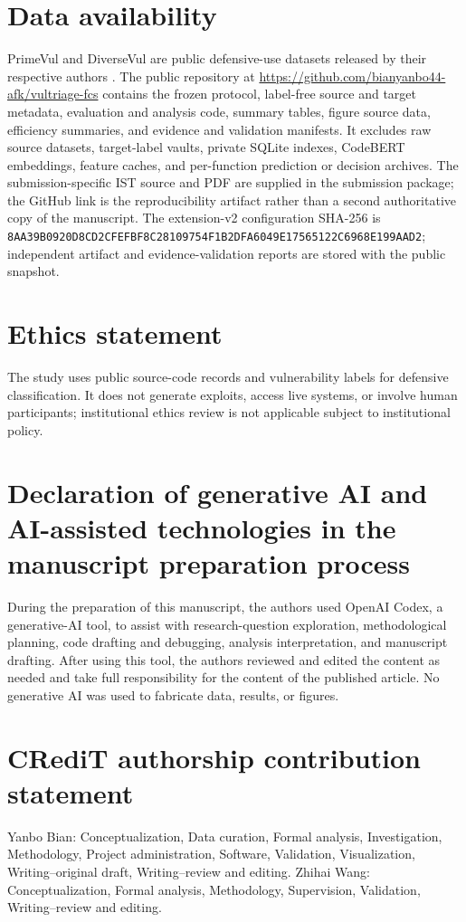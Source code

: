 \documentclass[preprint,12pt]{elsarticle}
\begin{document}
\section*{Data availability}
PrimeVul and DiverseVul are public defensive-use datasets released by their respective authors \cite{ding2025primevul,chen2023diversevul}. The public repository at \url{https://github.com/bianyanbo44-afk/vultriage-fcs} contains the frozen protocol, label-free source and target metadata, evaluation and analysis code, summary tables, figure source data, efficiency summaries, and evidence and validation manifests. It excludes raw source datasets, target-label vaults, private SQLite indexes, CodeBERT embeddings, feature caches, and per-function prediction or decision archives. The submission-specific IST source and PDF are supplied in the submission package; the GitHub link is the reproducibility artifact rather than a second authoritative copy of the manuscript. The extension-v2 configuration SHA-256 is \texttt{8AA39B09\allowbreak{}20D8CD2C\allowbreak{}FEFBF8C2\allowbreak{}8109754F\allowbreak{}1B2DFA60\allowbreak{}49E17565\allowbreak{}122C6968\allowbreak{}E199AAD2}; independent artifact and evidence-validation reports are stored with the public snapshot.

\section*{Ethics statement}
The study uses public source-code records and vulnerability labels for defensive classification. It does not generate exploits, access live systems, or involve human participants; institutional ethics review is not applicable subject to institutional policy.

\section*{Declaration of generative AI and AI-assisted technologies in the manuscript preparation process}
During the preparation of this manuscript, the authors used OpenAI Codex, a generative-AI tool, to assist with research-question exploration, methodological planning, code drafting and debugging, analysis interpretation, and manuscript drafting. After using this tool, the authors reviewed and edited the content as needed and take full responsibility for the content of the published article. No generative AI was used to fabricate data, results, or figures.

\section*{CRediT authorship contribution statement}
Yanbo Bian: Conceptualization, Data curation, Formal analysis, Investigation, Methodology, Project administration, Software, Validation, Visualization, Writing--original draft, Writing--review and editing. Zhihai Wang: Conceptualization, Formal analysis, Methodology, Supervision, Validation, Writing--review and editing.



\end{document}
